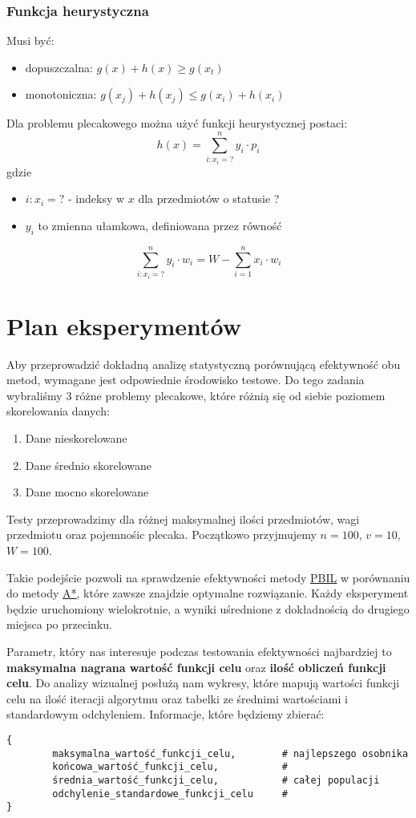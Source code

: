 \documentclass[11pt]{article}
\begin{document}
\subsubsection{Funkcja heurystyczna}
\label{sec:org7774c3a}
Musi być:
\begin{itemize}
\item dopuszczalna: \(g(x) + h(x) \geq g(x_t)\)
\item monotoniczna: \(g(x_j) + h(x_j) \leq g(x_i) + h(x_i)\)
\end{itemize}
Dla problemu plecakowego można użyć funkcji heurystycznej postaci:
$$
        h(x) = \sum_{i:x_i=?}^n{y_i \cdot p_i}
$$
gdzie
\begin{itemize}
\item \(i:x_i=?\) - indeksy w \(x\) dla przedmiotów o statusie ?
\item \(y_i\) to zmienna ułamkowa, definiowana przez równość
\end{itemize}
$$
        \sum_{i:x_i=?}^n{y_i \cdot w_i} = W - \sum_{i=1}^n{x_i \cdot w_i}
$$
\section{Plan eksperymentów}
\label{sec:org3030198}
Aby przeprowadzić dokładną analizę statystyczną porównującą efektywność obu metod, wymagane jest odpowiednie środowisko testowe. Do tego zadania wybraliśmy 3 różne problemy plecakowe, które różnią się od siebie poziomem skorelowania danych:
\begin{enumerate}
\item Dane nieskorelowane
\item Dane średnio skorelowane
\item Dane mocno skorelowane
\end{enumerate}
Testy przeprowadzimy dla różnej maksymalnej ilości przedmiotów, wagi przedmiotu oraz pojemnośic plecaka. Początkowo przyjmujemy \(n = 100\), \(v = 10\), \(W = 100\).

Takie podejście pozwoli na sprawdzenie efektywności metody \uline{\hyperref[sec:org90c2bcd]{PBIL}} w porównaniu do metody \hyperref[sec:orgb52f974]{\uline{A*}}, które zawsze znajdzie optymalne rozwiązanie. Każdy eksperyment będzie uruchomiony wielokrotnie, a wyniki uśrednione z dokładnością do drugiego miejsca po przecinku.

Parametr, który nas interesuje podczas testowania efektywności najbardziej to \textbf{maksymalna nagrana wartość funkcji celu} oraz \textbf{ilość obliczeń funkcji celu}. Do analizy wizualnej posłużą nam wykresy, które mapują wartości funkcji celu na ilość iteracji algorytmu oraz tabelki ze średnimi wartościami i standardowym odchyleniem. Informacje, które będziemy zbierać:
\begin{verbatim}
{
        maksymalna_wartość_funkcji_celu,        # najlepszego osobnika
        końcowa_wartość_funkcji_celu,           #
        średnia_wartość_funkcji_celu,           # całej populacji
        odchylenie_standardowe_funkcji_celu     #
}
\end{verbatim}
\end{document}
